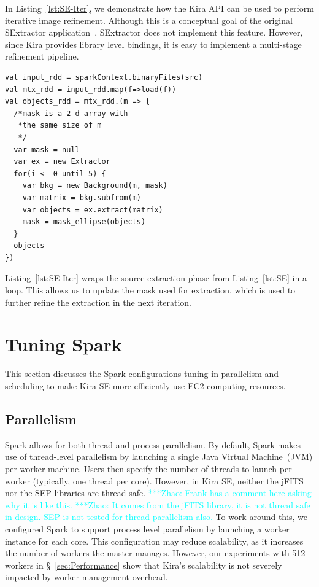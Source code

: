 \documentclass[conference]{IEEEtran}
\newcommand{\zhaonote}[1]{{\textcolor{cyan}    { ***Zhao:      #1 }}}
\newcommand{\zhaonote}[1]{}
\begin{document}
In Listing~\ref{lst:SE-Iter}, we demonstrate how the Kira API can be used to perform
iterative image refinement. Although this is a conceptual goal of the original SExtractor
application~\cite{bertin96}, SExtractor does not implement this feature. However, since Kira provides
library level bindings, it is easy to implement a multi-stage refinement pipeline.

\begin{lstlisting}[caption=Iterative Objects Extraction Logic, label=lst:SE-Iter, linewidth=0.5\textwidth, xleftmargin=2.5ex]
val input_rdd = sparkContext.binaryFiles(src)
val mtx_rdd = input_rdd.map(f=>load(f))
val objects_rdd = mtx_rdd.(m => {
  /*mask is a 2-d array with 
   *the same size of m
   */
  var mask = null
  var ex = new Extractor   
  for(i <- 0 until 5) {
    var bkg = new Background(m, mask)
    var matrix = bkg.subfrom(m) 
    var objects = ex.extract(matrix)
    mask = mask_ellipse(objects)  
  }
  objects
})
\end{lstlisting}

Listing~\ref{lst:SE-Iter} wraps the source extraction phase from Listing~\ref{lst:SE} in a loop. 
This allows us to update the mask used for extraction, which is used to further refine the extraction
 in the next iteration.


\section{Tuning Spark}
This section discusses the Spark configurations tuning in parallelism and scheduling to make
Kira SE more efficiently use EC2 computing resources. 

\subsection{Parallelism}

Spark allows for both thread and process parallelism. By default, Spark makes use of
thread-level parallelism by launching a single Java Virtual Machine~(JVM) per worker machine.
Users then specify the number of threads to launch per worker (typically, one thread per core).
However, in Kira SE, neither the jFITS nor the SEP libraries are thread safe. 
\zhaonote{Frank has a comment here asking why it is like this.}
\zhaonote{It comes from the jFITS library, it is not thread safe in design. SEP is not tested for thread parallelism also.}
To work around this,
we configured Spark to support process level parallelism by launching a worker instance for each
core. This configuration may reduce scalability,
as it increases the number of workers the master manages. However, our experiments with 512
workers in \S~\ref{sec:Performance} show that Kira's scalability is not severely impacted by
worker management overhead.
\end{document}

